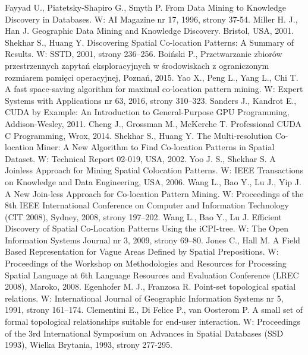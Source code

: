 \documentclass[12pt]{article}
\begin{document}
\begin{thebibliography}{}
Fayyad U., Piatetsky-Shapiro G., Smyth P. From Data Mining to Knowledge Discovery in Databases. W: AI Magazine nr 17, 1996, strony 37-54.
 Miller H. J., Han J. Geographic Data Mining and Knowledge Discovery.
Bristol, USA, 2001.
 Shekhar S., Huang Y. Discovering Spatial Co-location Patterns: A Summary of Results. W: SSTD, 2001, strony 236–256.
 Boiński P., Przetwarzanie zbiorów przestrzennych zapytań eksploracyjnych w środowiskach z ograniczonym rozmiarem pamięci operacyjnej, Poznań, 2015.
Yao X., Peng L., Yang L., Chi T. A fast space-saving algorithm for maximal co-location pattern mining. W: Expert Systems with Applications nr 63, 2016, strony 310–323.
Sanders J., Kandrot E., CUDA by Example: An Introduction to General-Purpose GPU Programming, Addison-Wesley, 2011.
Cheng J., Grossman M., McKerche T. Professional CUDA C Programming, Wrox, 2014.
Shekhar S., Huang Y. The Multi-resolution Co-location Miner: A New Algorithm to Find Co-location Patterns in Spatial Dataset. W: Technical Report 02-019, USA, 2002.
Yoo J. S., Shekhar S. A Joinless Approach for Mining Spatial Colocation Patterns. W: IEEE Transactions on Knowledge and Data Engineering, USA, 2006.
Wang L., Bao Y., Lu J., Yip J. A New Join-less Approach for Co-location Pattern Mining. W: Proceedings of the 8th IEEE International
Conference on Computer and Information Technology (CIT 2008), Sydney, 2008, strony 197–202.
Wang L., Bao Y., Lu J. Efficient Discovery of Spatial Co-Location Patterns Using the iCPI-tree. W: The Open Information Systems Journal nr 3, 2009, strony 69–80.
Jones C., Hall M. A Field Based Representation for Vague Areas Defined by Spatial Prepositions. W: Proceedings of the Workshop on Methodologies and Resources for Processing Spatial Language at 6th Language Resources and Evaluation Conference (LREC 2008), Maroko, 2008.
Egenhofer M. J., Franzosa R. Point-set topological spatial relations. W: International Journal of Geographic Information Systems nr 5, 1991, strony 161–174.
Clementini E., Di Felice P., van Oosterom P. A small set of formal topological relationships suitable for end-user interaction. W: Proceedings of the 3rd International Symposium on Advances in Spatial Databases (SSD 1993), Wielka Brytania, 1993, strony 277-295.

\end{thebibliography}
\end{document}
